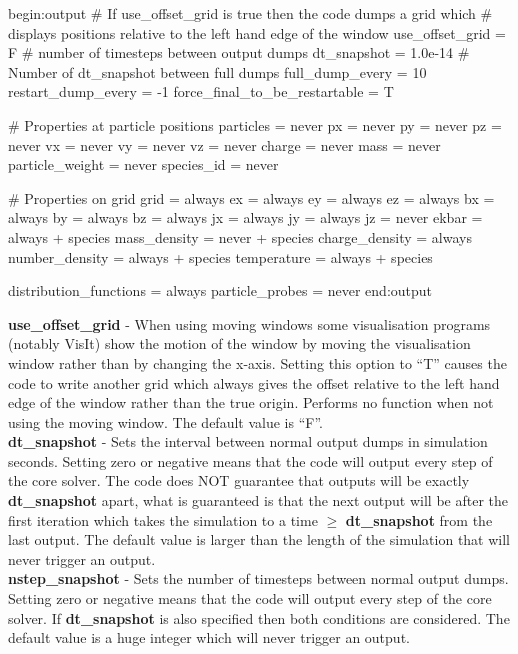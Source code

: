 \documentclass[12pt,a4paper]{article}
\newcommand{\emphtext}{\color{warwickdark} \fontfamily{phv}\selectfont\large\bf}
\newcommand{\inlineemph}[1]{{\color{warwicklight} \bf{#1}}}
\newenvironment{lboxverbatim}[1]{
\setlength{\FrameSep}{0pt}
\def\FrameCommand{\fboxsep=0pt \colorbox{shadecolor}}
\MakeFramed{\FrameRestore}
\vspace{-13.5pt}
\fvset{label=#1}
\boxverb
}{
\endboxverb
\vspace{-13.5pt}
\endMakeFramed
}
\begin{document}
\begin{lboxverbatim}{output block}
begin:output
   # If use_offset_grid is true then the code dumps a grid which
   # displays positions relative to the left hand edge of the window
   use_offset_grid = F
   # number of timesteps between output dumps
   dt_snapshot = 1.0e-14
   # Number of dt_snapshot between full dumps
   full_dump_every = 10
   restart_dump_every = -1
   force_final_to_be_restartable = T

   # Properties at particle positions
   particles = never
   px = never
   py = never
   pz = never
   vx = never
   vy = never
   vz = never
   charge = never
   mass = never
   particle_weight = never
   species_id = never

   # Properties on grid
   grid = always
   ex = always
   ey = always
   ez = always
   bx = always
   by = always
   bz = always
   jx = always
   jy = always
   jz = never
   ekbar = always + species
   mass_density = never + species
   charge_density = always
   number_density = always + species
   temperature = always + species

   distribution_functions = always
   particle_probes = never
end:output
\end{lboxverbatim}

{\emphtext use\_offset\_grid} - When using moving windows some visualisation
programs (notably VisIt) show the motion of the window by moving the
visualisation window rather than by changing the x-axis. Setting this option to
``T'' causes the code to write another grid which always gives the offset
relative to the left hand edge of the window rather than the true origin.
Performs no function when not using the moving window. The default value
is ``F''.\\

{\emphtext dt\_snapshot} - Sets the interval between normal output dumps in
simulation seconds. Setting zero or negative means that the code will output
every step of the core solver. The code does NOT guarantee that outputs will be
exactly \inlineemph{dt\_snapshot} apart, what is guaranteed is that the next
output will be after the first iteration which takes the simulation to a time
$\ge$ \inlineemph{dt\_snapshot} from the last output. The default value is
larger than the length of the simulation that will never trigger an output.\\

{\emphtext nstep\_snapshot} - Sets the number of timesteps between normal
output dumps. Setting zero or negative means that the code will output
every step of the core solver. If \inlineemph{dt\_snapshot} is also specified
then both conditions are considered. The default value is a huge integer
which will never trigger an output.\\
\end{document}
